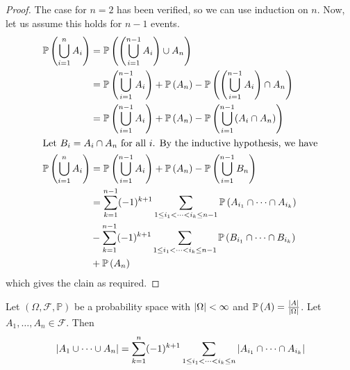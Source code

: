 \begin{proof}
	The case for \(n=2\) has been verified, so we can use induction on \(n\).
	Now, let us assume this holds for \(n-1\) events.
	\begin{align*}
		\mathbb{P}\left({\bigcup_{i=1}^n A_i}\right) & = \mathbb{P}\left({\left( \bigcup_{i=1}^{n-1} A_i  \right) \cup A_n}\right)                                                     \\
		                           & = \mathbb{P}\left({\bigcup_{i=1}^{n-1} A_i}\right) + \mathbb{P}\left({A_n}\right) - \mathbb{P}\left({\left( \bigcup_{i=1}^{n-1} A_i  \right) \cap A_n}\right)       \\
		                           & = \mathbb{P}\left({\bigcup_{i=1}^{n-1} A_i}\right) + \mathbb{P}\left({A_n}\right) - \mathbb{P}\left({\bigcup_{i=1}^{n-1} (A_i \cap A_n)}\right)                     \\
		\intertext{Let \(B_i = A_i \cap A_n\) for all \(i\).
			By the inductive hypothesis, we have}
		\mathbb{P}\left({\bigcup_{i=1}^n A_i}\right) & = \mathbb{P}\left({\bigcup_{i=1}^{n-1} A_i}\right) + \mathbb{P}\left({A_n}\right) - \mathbb{P}\left({\bigcup_{i=1}^{n-1} B_n}\right)                                \\
		                           & = \sum_{k=1}^{n-1} (-1)^{k+1} \sum_{1 \leq i_1 < \dots < i_k \leq n-1} \mathbb{P}\left({A_{i_1} \cap \dots \cap A_{i_k}}\right) \\&- \sum_{k=1}^{n-1} (-1)^{k+1} \sum_{1 \leq i_1 < \dots < i_k \leq n-1} \mathbb{P}\left({B_{i_1} \cap \dots \cap B_{i_k}}\right) \\ &+ \mathbb{P}\left({A_n}\right)
	\end{align*}
	which gives the clain as required.
\end{proof}

Let \((\Omega, \mathcal F, \mathbb P)\) be a probability space with \(\abs{\Omega} < \infty\) and \(\mathbb{P}\left({A}\right) = \frac{\abs{A}}{\abs{\Omega}}\).
Let \(A_1, \dots, A_n \in \mathcal F\).
Then
\[
	\abs{A_1 \cup \dots \cup A_n} = \sum_{k=1}^n (-1)^{k+1} \sum_{1 \leq i_1 < \dots < i_k \leq n} \abs{A_{i_1} \cap \dots \cap A_{i_k}}
\]

